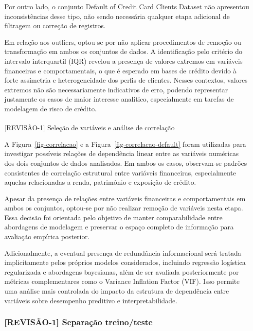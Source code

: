 \documentclass[
  brazilian,
  12pt,
  letterpaper,
  DIV=11,
  numbers=noendperiod]{scrartcl}
\makeatletter
\let\oldparagraph\paragraph
\renewcommand{\paragraph}{
    \@ifstar
      \xxxParagraphStar
      \xxxParagraphNoStar
  }
\newcommand{\xxxParagraphStar}[1]{\oldparagraph*{#1}\mbox{}}
\newcommand{\xxxParagraphNoStar}[1]{\oldparagraph{#1}\mbox{}}
\makeatother
\begin{document}
Por outro lado, o conjunto Default of Credit Card Clients Dataset não
apresentou inconsistências desse tipo, não sendo necessária qualquer
etapa adicional de filtragem ou correção de registros.

Em relação aos outliers, optou-se por não aplicar procedimentos de
remoção ou transformação em ambos os conjuntos de dados. A identificação
pelo critério do intervalo interquartil (IQR) revelou a presença de
valores extremos em variáveis financeiras e comportamentais, o que é
esperado em bases de crédito devido à forte assimetria e heterogeneidade
dos perfis de clientes. Nesses contextos, valores extremos não são
necessariamente indicativos de erro, podendo representar justamente os
casos de maior interesse analítico, especialmente em tarefas de
modelagem de risco de crédito.

\paragraph{{[}REVISÃO-1{]} Seleção de variáveis e análise de
correlação}\label{revisuxe3o-1-seleuxe7uxe3o-de-variuxe1veis-e-anuxe1lise-de-correlauxe7uxe3o}

A Figura~\ref{fig-correlacao} e a Figura~\ref{fig-correlacao-default}
foram utilizadas para investigar possíveis relações de dependência
linear entre as variáveis numéricas dos dois conjuntos de dados
analisados. Em ambos os casos, observam-se padrões consistentes de
correlação estrutural entre variáveis financeiras, especialmente aquelas
relacionadas a renda, patrimônio e exposição de crédito.

Apesar da presença de relações entre variáveis financeiras e
comportamentais em ambos os conjuntos, optou-se por não realizar remoção
de variáveis nesta etapa. Essa decisão foi orientada pelo objetivo de
manter comparabilidade entre abordagens de modelagem e preservar o
espaço completo de informação para avaliação empírica posterior.

Adicionalmente, a eventual presença de redundância informacional será
tratada implicitamente pelos próprios modelos considerados, incluindo
regressão logística regularizada e abordagens bayesianas, além de ser
avaliada posteriormente por métricas complementares como o Variance
Inflation Factor (VIF). Isso permite uma análise mais controlada do
impacto da estrutura de dependência entre variáveis sobre desempenho
preditivo e interpretabilidade.

\subsubsection{{[}REVISÃO-1{]} Separação
treino/teste}\label{revisuxe3o-1-separauxe7uxe3o-treinoteste}
\end{document}
